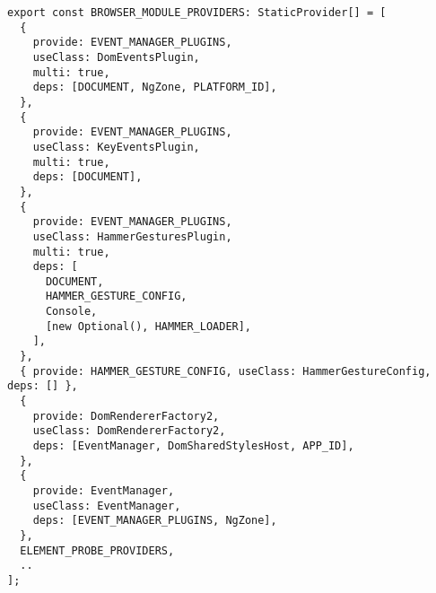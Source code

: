 \begin{verbatim}
export const BROWSER_MODULE_PROVIDERS: StaticProvider[] = [
  {
    provide: EVENT_MANAGER_PLUGINS,
    useClass: DomEventsPlugin,
    multi: true,
    deps: [DOCUMENT, NgZone, PLATFORM_ID],
  },
  {
    provide: EVENT_MANAGER_PLUGINS,
    useClass: KeyEventsPlugin,
    multi: true,
    deps: [DOCUMENT],
  },
  {
    provide: EVENT_MANAGER_PLUGINS,
    useClass: HammerGesturesPlugin,
    multi: true,
    deps: [
      DOCUMENT,
      HAMMER_GESTURE_CONFIG,
      Console,
      [new Optional(), HAMMER_LOADER],
    ],
  },
  { provide: HAMMER_GESTURE_CONFIG, useClass: HammerGestureConfig, deps: [] },
  {
    provide: DomRendererFactory2,
    useClass: DomRendererFactory2,
    deps: [EventManager, DomSharedStylesHost, APP_ID],
  },
  {
    provide: EventManager,
    useClass: EventManager,
    deps: [EVENT_MANAGER_PLUGINS, NgZone],
  },
  ELEMENT_PROBE_PROVIDERS,
  ..
];
\end{verbatim}
